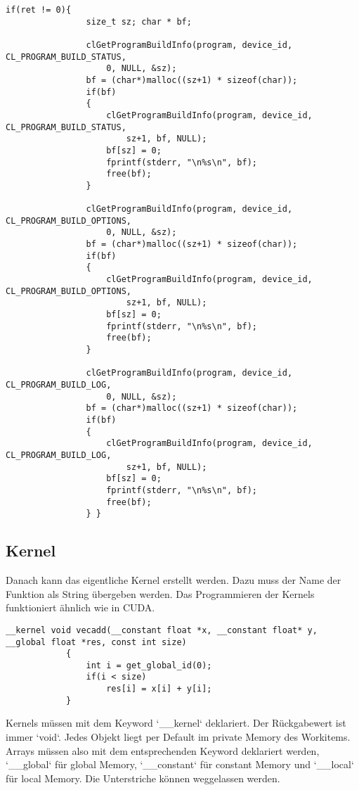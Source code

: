 			\newpage			
			\begin{lstlisting}[caption=~Fehlerabfrage OpenCL Compiler]
			if(ret != 0){
				size_t sz; char * bf;

				clGetProgramBuildInfo(program, device_id, CL_PROGRAM_BUILD_STATUS, 
					0, NULL, &sz);
				bf = (char*)malloc((sz+1) * sizeof(char));
				if(bf)
				{
					clGetProgramBuildInfo(program, device_id, CL_PROGRAM_BUILD_STATUS, 
						sz+1, bf, NULL);
					bf[sz] = 0;
					fprintf(stderr, "\n%s\n", bf);
					free(bf);
				}

				clGetProgramBuildInfo(program, device_id, CL_PROGRAM_BUILD_OPTIONS, 
					0, NULL, &sz);
				bf = (char*)malloc((sz+1) * sizeof(char));
				if(bf)
				{
					clGetProgramBuildInfo(program, device_id, CL_PROGRAM_BUILD_OPTIONS, 
						sz+1, bf, NULL);
					bf[sz] = 0;
					fprintf(stderr, "\n%s\n", bf);
					free(bf);
				}
				
				clGetProgramBuildInfo(program, device_id, CL_PROGRAM_BUILD_LOG, 
					0, NULL, &sz);
				bf = (char*)malloc((sz+1) * sizeof(char));
				if(bf)
				{
					clGetProgramBuildInfo(program, device_id, CL_PROGRAM_BUILD_LOG, 
						sz+1, bf, NULL);
					bf[sz] = 0;
					fprintf(stderr, "\n%s\n", bf);
					free(bf);
				} }
			\end{lstlisting}
			
			\newpage
			
			\subsection{Kernel}
			Danach kann das eigentliche \Gls{Kernel} erstellt werden. Dazu muss der Name der Funktion als String übergeben werden. Das Programmieren der Kernels funktioniert ähnlich wie in CUDA.			
			\begin{lstlisting}[caption=~Kerneldefinition]
			__kernel void vecadd(__constant float *x, __constant float* y, __global float *res, const int size)
			{
  				int i = get_global_id(0);
  				if(i < size)
    				res[i] = x[i] + y[i];
			}
			\end{lstlisting}
			
			\Glspl{Kernel} müssen mit dem Keyword \li`__kernel` deklariert. Der Rückgabewert ist immer \li`void`. Jedes Objekt liegt per Default im \gls{private Memory} des \Glspl{Workitem}. Arrays müssen also mit dem entsprechenden Keyword deklariert werden, \li`__global` für \gls{global Memory}, \li`__constant` für \gls{constant Memory} und \li`__local` für \gls{local Memory}. Die Unterstriche können weggelassen werden. 
			

